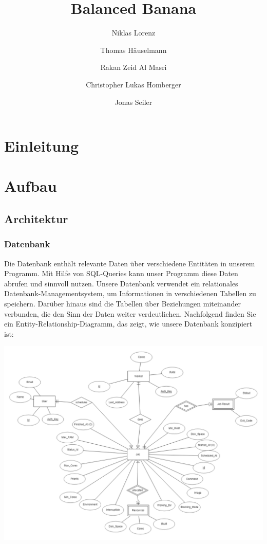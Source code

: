 \documentclass[a4paper,12pt]{article}
\title{Balanced Banana}
\author{Niklas Lorenz \and Thomas Häuselmann \and Rakan Zeid Al Masri \and Christopher Lukas Homberger \and Jonas Seiler}
\begin{document}
\setcounter{page}{2}
\tableofcontents          %
\clearpage
{}

\section{Einleitung}
\vspace{1cm}


\clearpage
\section{Aufbau}

\subsection{Architektur}

\subsubsection{Datenbank}

	Die Datenbank enthält relevante Daten über verschiedene Entitäten in unserem Programm. Mit Hilfe von SQL-Queries kann unser Programm diese Daten abrufen und sinnvoll nutzen.  Unsere Datenbank verwendet ein relationales Datenbank-Managementsystem, um Informationen in verschiedenen Tabellen zu speichern. Darüber hinaus sind die Tabellen über Beziehungen miteinander verbunden, die den Sinn der Daten weiter verdeutlichen. Nachfolgend finden Sie ein Entity-Relationship-Diagramm, das zeigt, wie unsere Datenbank konzipiert ist:

\includegraphics[width=\textwidth]{database_relational}
\end{document}

